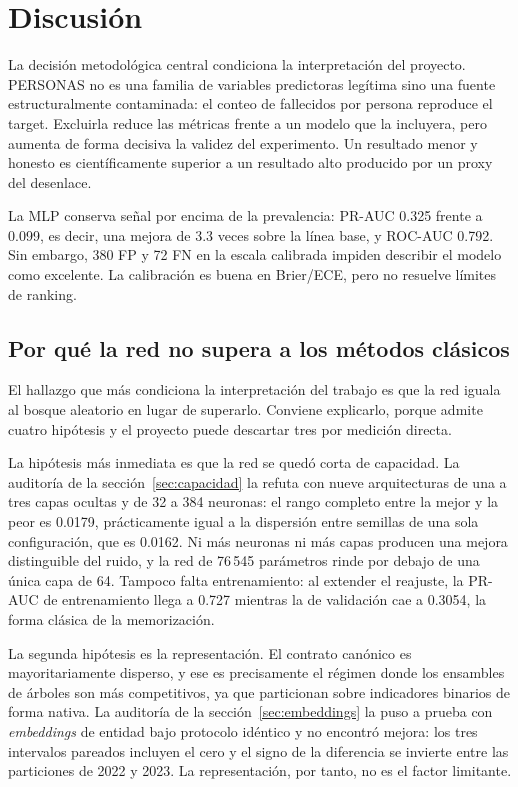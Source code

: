 \section{Discusión}\label{sec:discusion}

La decisión metodológica central condiciona la interpretación del proyecto. PERSONAS no es una familia de variables predictoras legítima sino una fuente estructuralmente contaminada: el conteo de fallecidos por persona reproduce el target. Excluirla reduce las métricas frente a un modelo que la incluyera, pero aumenta de forma decisiva la validez del experimento. Un resultado menor y honesto es científicamente superior a un resultado alto producido por un proxy del desenlace.

La MLP conserva señal por encima de la prevalencia: PR-AUC 0.325 frente a 0.099, es decir, una mejora de 3.3 veces sobre la línea base, y ROC-AUC 0.792. Sin embargo, 380 FP y 72 FN en la escala calibrada impiden describir el modelo como excelente. La calibración es buena en Brier/ECE, pero no resuelve límites de ranking.

\subsection{Por qué la red no supera a los métodos clásicos}
El hallazgo que más condiciona la interpretación del trabajo es que la red iguala al bosque aleatorio en lugar de superarlo. Conviene explicarlo, porque admite cuatro hipótesis y el proyecto puede descartar tres por medición directa.

La hipótesis más inmediata es que la red se quedó corta de capacidad. La auditoría de la sección~\ref{sec:capacidad} la refuta con nueve arquitecturas de una a tres capas ocultas y de 32 a 384 neuronas: el rango completo entre la mejor y la peor es 0.0179, prácticamente igual a la dispersión entre semillas de una sola configuración, que es 0.0162. Ni más neuronas ni más capas producen una mejora distinguible del ruido, y la red de 76\,545 parámetros rinde por debajo de una única capa de 64. Tampoco falta entrenamiento: al extender el reajuste, la PR-AUC de entrenamiento llega a 0.727 mientras la de validación cae a 0.3054, la forma clásica de la memorización.

La segunda hipótesis es la representación. El contrato canónico es mayoritariamente disperso, y ese es precisamente el régimen donde los ensambles de árboles son más competitivos, ya que particionan sobre indicadores binarios de forma nativa. La auditoría de la sección~\ref{sec:embeddings} la puso a prueba con \emph{embeddings} de entidad bajo protocolo idéntico y no encontró mejora: los tres intervalos pareados incluyen el cero y el signo de la diferencia se invierte entre las particiones de 2022 y 2023. La representación, por tanto, no es el factor limitante.


